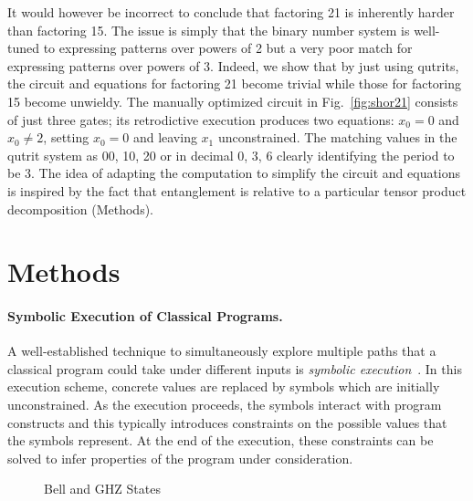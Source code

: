 \documentclass[sigplan]{acmart}
\begin{document}
It would however be incorrect to conclude that factoring 21 is
inherently harder than factoring 15. The issue is simply that the
binary number system is well-tuned to expressing patterns over powers
of 2 but a very poor match for expressing patterns over powers of
3. Indeed, we show that by just using qutrits, the circuit and
equations for factoring 21 become trivial while those for factoring 15
become unwieldy. The manually optimized circuit in
Fig.~\ref{fig:shor21} consists of just three gates; its retrodictive
execution produces two equations: $x_0=0$ and $x_0 \neq 2$, setting
$x_0=0$ and leaving $x_1$ unconstrained. The matching values in the
qutrit system as 00, 10, 20 or in decimal 0, 3, 6 clearly identifying
the period to be 3. The idea of adapting the computation to simplify
the circuit and equations is inspired by the fact that entanglement is
relative to a particular tensor product decomposition (Methods).

\section*{Methods}

\paragraph*{Symbolic Execution of Classical Programs.}
A well-established technique to simultaneously explore multiple paths
that a classical program could take under different inputs is
\emph{symbolic
  execution}~\cite{10.1145/390016.808445,10.1145/360248.360252,howden,10.1145/800191.805647,10.1145/3182657}. In
this execution scheme, concrete values are replaced by symbols which are
initially unconstrained. As the execution proceeds, the symbols
interact with program constructs and this typically introduces
constraints on the possible values that the symbols represent. At the
end of the execution, these constraints can be solved to infer
properties of the program under consideration. 

\begin{wrapfigure}{r}{7cm}
\begin{center}
\qquad
{}
\end{center}
\caption{\label{fig:bell2}Bell and GHZ States}
\end{wrapfigure}
\end{document}
